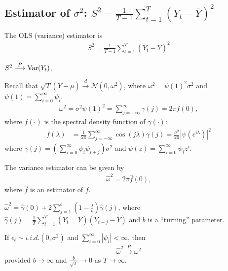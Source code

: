 \documentclass[11pt]{elegantbook}
\begin{document}
\subsection{Estimator of $\sigma^2$: $S^2=\frac{1}{T-1}\sum_{t=1}^T\left(Y_t-\bar{Y}\right)^2$}
The OLS (variance) estimator is
\begin{equation}
    \begin{aligned}
        S^2=\frac{1}{T-1}\sum_{t=1}^T\left(Y_t-\bar{Y}\right)^2
    \end{aligned}
    \nonumber
\end{equation}
\begin{claim}
    $S^2 \stackrel{P}{\longrightarrow} \textnormal{Var}(Y_t)$.
\end{claim}
Recall that $\sqrt{T}\left(\bar{Y}-\mu\right)\stackrel{d}{\longrightarrow} \mathcal{N}\left(0,\omega^2\right)$, where $\omega^2=\psi(1)^2\sigma^2$ and $\psi(1)=\sum_{i=0}^\infty \psi_i$.
\begin{equation}
    \begin{aligned}
        \omega^2=\sigma^2\psi(1)^2=\sum_{j=-\infty}^\infty\gamma(j)=2\pi f(0),
    \end{aligned}
    \nonumber
\end{equation}
where $f(\cdot)$ is the spectral density function of $\gamma(\cdot)$:
\begin{equation}
    \begin{aligned}
        f(\lambda)&=\frac{1}{2\pi}\sum_{j=-\infty}^\infty \cos\left(j\lambda\right)\gamma(j)=\frac{\sigma^2}{2\pi}|\psi(e^{i\lambda})|^2
    \end{aligned}
    \nonumber
\end{equation}
where $\gamma(j)=(\sum_{i=0}^\infty \psi_i\psi_{i+j})\sigma^2$ and $\psi(z)=\sum_{i=0}^\infty \psi_iz^i$.

The variance estimator can be given by
\begin{equation}
    \begin{aligned}
        \hat{\omega}^2=2\pi\hat{f}(0),
    \end{aligned}
    \nonumber
\end{equation}
where $\hat{f}$ is an estimator of $f$.
\begin{example}
    $\hat{\omega}^2=\hat{\gamma}(0)+2\sum_{j=1}^b\left(1-\frac{j}{b}\right)\hat{\gamma}(j)$, where $\hat{\gamma}(j)=\frac{1}{T}\sum_{t=1}^T(Y_t=\bar{Y})\left(Y_{t-j}-\bar{Y}\right)$ and $b$ is a ``turning'' parameter.
\end{example}
\begin{remark}
    If $\epsilon_t\sim{i.i.d.}(0,\sigma^2)$ and $\sum_{i=0}^\infty |\psi_i|<\infty$, then
    \begin{equation}
        \begin{aligned}
            \hat{\omega}^2 \stackrel{P}{\longrightarrow} \omega^2
        \end{aligned}
        \nonumber
    \end{equation}
    provided $b \rightarrow \infty$ and $\frac{b}{\sqrt{T}} \rightarrow 0$ as $T \rightarrow \infty$.
\end{remark}
\end{document}
